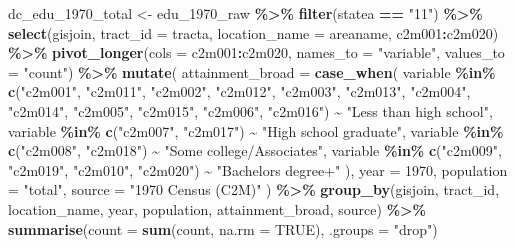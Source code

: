 \documentclass[
]{article}
\newenvironment{Shaded}{\begin{snugshade}}{\end{snugshade}}
\newcommand{\AttributeTok}[1]{\textcolor[rgb]{0.13,0.29,0.53}{#1}}
\newcommand{\ConstantTok}[1]{\textcolor[rgb]{0.56,0.35,0.01}{#1}}
\newcommand{\DecValTok}[1]{\textcolor[rgb]{0.00,0.00,0.81}{#1}}
\newcommand{\FunctionTok}[1]{\textcolor[rgb]{0.13,0.29,0.53}{\textbf{#1}}}
\newcommand{\NormalTok}[1]{#1}
\newcommand{\OtherTok}[1]{\textcolor[rgb]{0.56,0.35,0.01}{#1}}
\newcommand{\SpecialCharTok}[1]{\textcolor[rgb]{0.81,0.36,0.00}{\textbf{#1}}}
\newcommand{\StringTok}[1]{\textcolor[rgb]{0.31,0.60,0.02}{#1}}
\begin{document}
\begin{Shaded}
\begin{Highlighting}[]
\NormalTok{dc\_edu\_1970\_total }\OtherTok{\textless{}{-}}\NormalTok{ edu\_1970\_raw }\SpecialCharTok{\%\textgreater{}\%}
  \FunctionTok{filter}\NormalTok{(statea }\SpecialCharTok{==} \StringTok{"11"}\NormalTok{) }\SpecialCharTok{\%\textgreater{}\%}
  \FunctionTok{select}\NormalTok{(gisjoin, }\AttributeTok{tract\_id =}\NormalTok{ tracta, }\AttributeTok{location\_name =}\NormalTok{ areaname, c2m001}\SpecialCharTok{:}\NormalTok{c2m020) }\SpecialCharTok{\%\textgreater{}\%}
  \FunctionTok{pivot\_longer}\NormalTok{(}\AttributeTok{cols =}\NormalTok{ c2m001}\SpecialCharTok{:}\NormalTok{c2m020, }\AttributeTok{names\_to =} \StringTok{"variable"}\NormalTok{, }\AttributeTok{values\_to =} \StringTok{"count"}\NormalTok{) }\SpecialCharTok{\%\textgreater{}\%}
  \FunctionTok{mutate}\NormalTok{(}
    \AttributeTok{attainment\_broad =} \FunctionTok{case\_when}\NormalTok{(}
\NormalTok{      variable }\SpecialCharTok{\%in\%} \FunctionTok{c}\NormalTok{(}\StringTok{"c2m001"}\NormalTok{, }\StringTok{"c2m011"}\NormalTok{, }\StringTok{"c2m002"}\NormalTok{, }\StringTok{"c2m012"}\NormalTok{, }\StringTok{"c2m003"}\NormalTok{, }\StringTok{"c2m013"}\NormalTok{, }
                       \StringTok{"c2m004"}\NormalTok{, }\StringTok{"c2m014"}\NormalTok{, }\StringTok{"c2m005"}\NormalTok{, }\StringTok{"c2m015"}\NormalTok{, }\StringTok{"c2m006"}\NormalTok{, }\StringTok{"c2m016"}\NormalTok{) }\SpecialCharTok{\textasciitilde{}} \StringTok{"Less than high school"}\NormalTok{,}
\NormalTok{      variable }\SpecialCharTok{\%in\%} \FunctionTok{c}\NormalTok{(}\StringTok{"c2m007"}\NormalTok{, }\StringTok{"c2m017"}\NormalTok{) }\SpecialCharTok{\textasciitilde{}} \StringTok{"High school graduate"}\NormalTok{,}
\NormalTok{      variable }\SpecialCharTok{\%in\%} \FunctionTok{c}\NormalTok{(}\StringTok{"c2m008"}\NormalTok{, }\StringTok{"c2m018"}\NormalTok{) }\SpecialCharTok{\textasciitilde{}} \StringTok{"Some college/Associate\textquotesingle{}s"}\NormalTok{,}
\NormalTok{      variable }\SpecialCharTok{\%in\%} \FunctionTok{c}\NormalTok{(}\StringTok{"c2m009"}\NormalTok{, }\StringTok{"c2m019"}\NormalTok{, }\StringTok{"c2m010"}\NormalTok{, }\StringTok{"c2m020"}\NormalTok{) }\SpecialCharTok{\textasciitilde{}} \StringTok{"Bachelor\textquotesingle{}s degree+"}
\NormalTok{    ),}
    \AttributeTok{year =} \DecValTok{1970}\NormalTok{, }\AttributeTok{population =} \StringTok{"total"}\NormalTok{, }\AttributeTok{source =} \StringTok{"1970 Census (C2M)"}
\NormalTok{  ) }\SpecialCharTok{\%\textgreater{}\%}
  \FunctionTok{group\_by}\NormalTok{(gisjoin, tract\_id, location\_name, year, population, attainment\_broad, source) }\SpecialCharTok{\%\textgreater{}\%}
  \FunctionTok{summarise}\NormalTok{(}\AttributeTok{count =} \FunctionTok{sum}\NormalTok{(count, }\AttributeTok{na.rm =} \ConstantTok{TRUE}\NormalTok{), }\AttributeTok{.groups =} \StringTok{"drop"}\NormalTok{)}



\end{Highlighting}
\end{Shaded}
\end{document}
